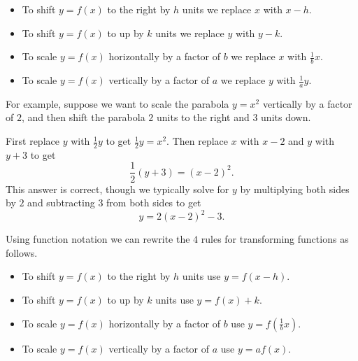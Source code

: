 \documentclass{ximera}
\begin{document}
\begin{itemize}
\item To shift $y=f(x)$ to the right by $h$ units we replace $x$ with $x-h$.
\item To shift $y=f(x)$ to up by $k$ units we replace $y$ with $y-k$.
\item To scale $y=f(x)$ horizontally by a factor of $b$ we replace $x$ with $\frac{1}{b} x$.
\item To scale $y=f(x)$ vertically by a factor of $a$ we replace $y$ with $\frac{1}{a} y$.
\end{itemize}

For example, suppose we want to scale the parabola $y=x^2$ vertically by a factor of $2$, and then shift the parabola $2$ units to the right and $3$ units down.

First replace $y$ with $\frac{1}{2}y$ to get $\frac{1}{2}y=x^2$. Then replace $x$ with $x-2$ and $y$ with $y+3$ to get 
\[\frac{1}{2}(y+3)=(x-2)^2.\] 
This answer is correct, though we typically solve for $y$ by multiplying both sides by $2$ and subtracting $3$ from both sides to get
\[
y=2(x-2)^2-3.
\]

Using function notation we can rewrite the $4$ rules for transforming functions as follows.

\begin{itemize}
\item To shift $y=f(x)$ to the right by $h$ units use $y=f(x-h)$.
\item To shift $y=f(x)$ to up by $k$ units use $y=f(x)+k$.
\item To scale $y=f(x)$ horizontally by a factor of $b$ use $y=f\left(\frac{1}{b}x\right)$.
\item To scale $y=f(x)$ vertically by a factor of $a$ use $y=a f(x)$.
\end{itemize}
\end{document}
